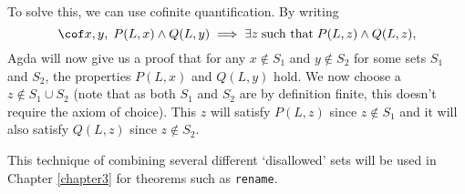 To solve this, we can use cofinite quantification. By writing
\begin{equation*}
  \cof x, y, \; P(L, x) \wedge Q(L, y)
  \implies \exists z \; \text{such that} \; P(L, z) \wedge Q(L, z),
\end{equation*}
Agda will now give us a proof that for any $x \notin S_1$ and $y \notin S_2$ for some sets $S_1$ and
$S_2$, the properties $P(L, x)$ and $Q(L, y)$ hold. We now choose a $z \notin S_1 \cup
S_2$ (note that as both $S_1$ and $S_2$ are by definition finite, this doesn't require the
axiom of choice). This $z$ will satisfy $P(L, z)$ since $z \notin S_1$ and it will also satisfy
$Q(L, z)$ since $z \notin S_2$.

This technique of combining several different `disallowed' sets will be used in Chapter
\ref{chapter3} for theorems such as \texttt{rename}.

